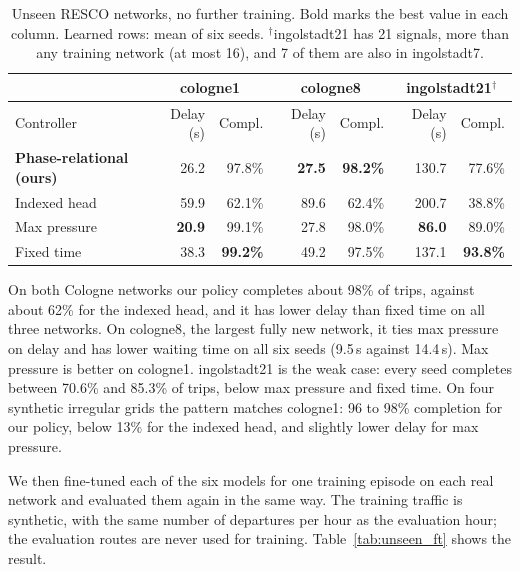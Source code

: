 \documentclass[10pt,twocolumn,a4paper]{article}
\begin{document}
\begin{table}[t]
\centering\footnotesize
\setlength{\tabcolsep}{6pt}
\begin{tabular}{|l|r|r|r|r|r|r|}
\hline
 & \multicolumn{2}{c|}{cologne1} & \multicolumn{2}{c|}{cologne8} & \multicolumn{2}{c|}{ingolstadt21$^\dagger$} \\ \hline
Controller & Delay (s) & Compl. & Delay (s) & Compl. & Delay (s) & Compl. \\ \hline
\textbf{Phase-relational (ours)} & 26.2 & 97.8\% & \textbf{27.5} & \textbf{98.2\%} & 130.7 & 77.6\% \\ \hline
Indexed head & 59.9 & 62.1\% & 89.6 & 62.4\% & 200.7 & 38.8\% \\ \hline
Max pressure & \textbf{20.9} & 99.1\% & 27.8 & 98.0\% & \textbf{86.0} & 89.0\% \\ \hline
Fixed time & 38.3 & \textbf{99.2\%} & 49.2 & 97.5\% & 137.1 & \textbf{93.8\%} \\ \hline
\end{tabular}
\caption{Unseen RESCO networks, no further training. Bold marks the best value in each
column. Learned rows: mean of six seeds. $^\dagger$ingolstadt21 has 21 signals, more than any
training network (at most 16), and 7 of them are also in ingolstadt7.}
\label{tab:unseen_nets}
\end{table}

On both Cologne networks our policy completes about 98\% of trips, against about 62\% for the
indexed head, and it has lower delay than fixed time on all three networks. On cologne8, the
largest fully new network, it ties max pressure on delay and has lower waiting time on all six
seeds (9.5\,s against 14.4\,s). Max pressure is better on cologne1. ingolstadt21 is the weak
case: every seed completes between 70.6\% and 85.3\% of trips, below max pressure and fixed
time. On four synthetic irregular grids the pattern matches cologne1: 96 to 98\% completion for
our policy, below 13\% for the indexed head, and slightly lower delay for max pressure.

We then fine-tuned each of the six models for one training episode on each real
network and evaluated them again in the same way. The training traffic is synthetic, with
the same number of departures per hour as the evaluation hour; the evaluation routes are
never used for training. Table~\ref{tab:unseen_ft} shows the result.
\end{document}
